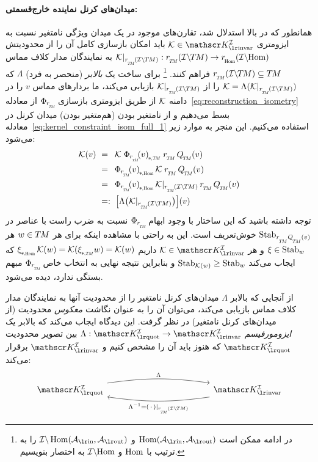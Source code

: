 \paragraph{میدان‌های کرنل نماینده خارج‌قسمتی:}
همانطور که در بالا استدلال شد، تقارن‌های موجود در یک میدان ویژگی \mbox{نامتغیر} نسبت به \mbox{ایزومتری} $\K \in \KIfull$ باید امکان بازسازی کامل آن را از محدودیتش ${\Krestr: \rTM(\ITM) \to \rHom(\IHom)}$ به نمایندگان مدار کلاف مماس $\rTM(\ITM) \subseteq \TM$ فراهم کنند.%
\footnote{
    در ادامه ممکن است $\Hom(\Ain,\Aout)$ و $\I\backslash \Hom(\Ain,\Aout)$ را به ترتیب با $\operatorname{Hom}$ و $\mathcal{I}\backslash\mkern-4mu \operatorname{Hom}$ به اختصار بنویسیم.
}
برای ساخت یک \emph{بالابر} (منحصر به فرد) $\Lambda$ که $\K = \Lambda(\Krestr)$ را از $\Krestr$ بازیابی می‌کند، ما بردارهای مماس $v$ را در دامنه $\mathcal{K}$ از طریق ایزومتری بازسازی $\PhirNoArg$ از معادله~\eqref{eq:reconstruction_isometry} بسط می‌دهیم و از نامتغیر بودن (هم‌متغیر بودن) میدان کرنل در معادله~\eqref{eq:kernel_constraint_isom_full_1} استفاده می‌کنیم.
این منجر به موارد زیر می‌شود:
\begin{align}\label{eq:lambda_construction}
    \K(v)
    \ &=\,\ \K\; \dPhirTM{v}\; \rTM\, \QTM (v) \notag \\
    \ &=\,\ \dPhirHom{v}\, \K\; \rTM\, \QTM (v) \notag \\
    \ &=\,\ \dPhirHom{v}\, \Krestr\, \rTM\, \QTM (v) \notag \\
    \ &=:\  \pig[ \Lambda\big(\Krestr\big) \pig] (v)
\end{align}
توجه داشته باشید که این ساختار با وجود ابهام $\PhirNoArg$ نسبت به ضرب راست با عناصر در $\Stab{\rTM\QTM(v)}$ خوش‌تعریف است.
این به راحتی با مشاهده اینکه برای هر $w \in T\mkern-1.5muM$ هر $\xi \in \operatorname{Stab}_{w}$ و هر $\K \in \KIfull$ داریم $\dxiHom \K(w) = \K(\dxiTM w) = \K(w)$ که ایجاب می‌کند $\operatorname{Stab}_{\mathcal{K}(w)} \geq \operatorname{Stab}_{w}$ و بنابراین نتیجه نهایی به انتخاب خاص $\PhirNoArg$ مبهم بستگی ندارد، دیده می‌شود.


از آنجایی که بالابر $\Lambda$ میدان‌های کرنل نامتغیر را از محدودیت آنها به نمایندگان مدار کلاف مماس بازیابی می‌کند، می‌توان آن را به عنوان نگاشت \emph{معکوس} محدودیت (از میدان‌های کرنل نامتغیر) در نظر گرفت.
این دیدگاه ایجاب می‌کند که بالابر یک \emph{ایزومورفیسم} $\Lambda: \KIquot \to \KIfull$ بین تصویر محدودیت $\KIquot$ که هنوز باید آن را مشخص کنیم و $\KIfull$ برقرار می‌کند:
\begin{equation}
    \begin{tikzcd}[row sep=3.5em, column sep=12.em]
        \KIquot
            \arrow[r, bend left=8, shift left=2pt, "\Lambda"]
        &
        \KIfull
            \arrow[l, bend left=8, shift left=2pt, "\Lambda^{-1} = (\,\cdot\,)|_{\rTM(\ITM)}"]
    \end{tikzcd}
\end{equation}

